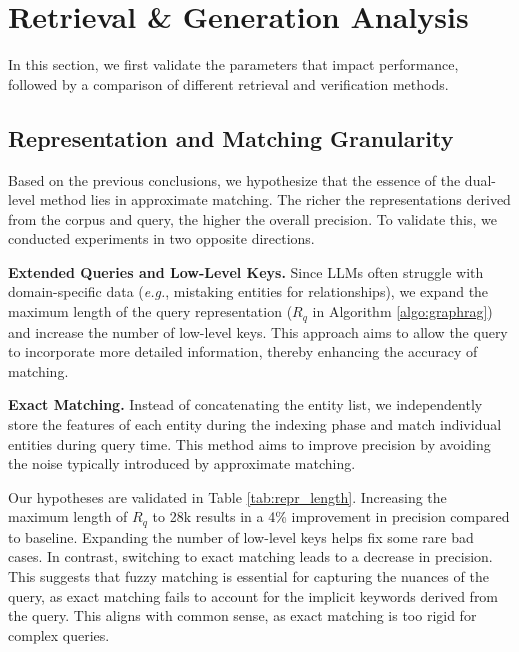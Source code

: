 \documentclass[11pt]{article}
\begin{document}
\section{Retrieval \& Generation Analysis} 

In this section, we first validate the parameters that impact performance, followed by a comparison of different retrieval and verification methods. 

\subsection{Representation and Matching Granularity}

Based on the previous conclusions, we hypothesize that the essence of the dual-level method lies in approximate matching. The richer the representations derived from the corpus and query, the higher the overall precision. To validate this, we conducted experiments in two opposite directions.

\noindent\textbf{Extended Queries and Low-Level Keys.} Since LLMs often struggle with domain-specific data (\textit{e.g.}, mistaking entities for relationships), we expand the maximum length of the query representation ($R_q$ in Algorithm \ref{algo:graphrag}) and increase the number of low-level keys. This approach aims to allow the query to incorporate more detailed information, thereby enhancing the accuracy of matching.

\noindent\textbf{Exact Matching.} Instead of concatenating the entity list, we independently store the features of each entity during the indexing phase and match individual entities during query time. This method aims to improve precision by avoiding the noise typically introduced by approximate matching.

Our hypotheses are validated in Table \ref{tab:repr_length}. Increasing the maximum length of $R_q$ to 28k results in a 4\% improvement in precision compared to baseline. Expanding the number of low-level keys helps fix some rare bad cases. In contrast, switching to exact matching leads to a decrease in precision. This suggests that fuzzy matching is essential for capturing the nuances of the query, as exact matching fails to account for the implicit keywords derived from the query. This aligns with common sense, as exact matching is too rigid for complex queries. 
\end{document}
